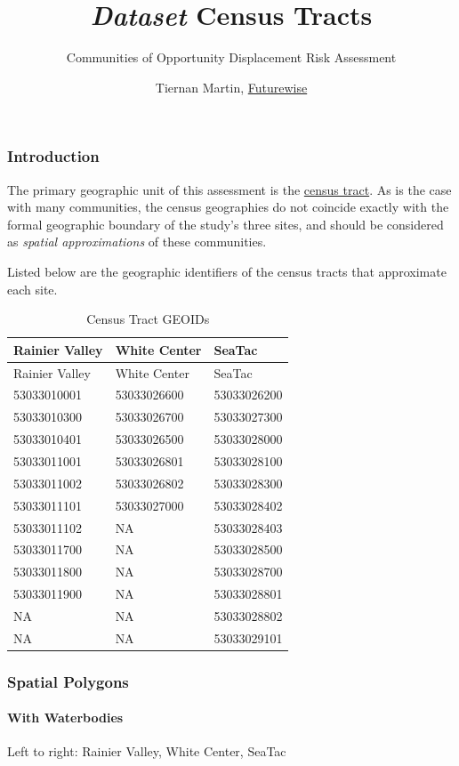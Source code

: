 \documentclass[]{article}
\title{\emph{Dataset} \textbar{} Census Tracts}
\subtitle{Communities of Opportunity Displacement Risk Assessment}
\author{Tiernan Martin, \href{http://www.futurewisewa.org/}{Futurewise}}
\date{}
\let\oldparagraph\paragraph
\renewcommand{\paragraph}[1]{\oldparagraph{#1}\mbox{}}
\begin{document}
\maketitle

\subsubsection{Introduction}\label{introduction}

The primary geographic unit of this assessment is the
\href{https://www.census.gov/geo/reference/gtc/gtc_ct.html}{census
tract}. As is the case with many communities, the census geographies do
not coincide exactly with the formal geographic boundary of the study's
three sites, and should be considered as \emph{spatial approximations}
of these communities.

Listed below are the geographic identifiers of the census tracts that
approximate each site.

\begin{longtable}[]{@{}lll@{}}
\caption{Census Tract GEOIDs}\tabularnewline
\toprule
Rainier Valley & White Center & SeaTac\tabularnewline
\midrule
\endfirsthead
\toprule
Rainier Valley & White Center & SeaTac\tabularnewline
\midrule
\endhead
53033010001 & 53033026600 & 53033026200\tabularnewline
53033010300 & 53033026700 & 53033027300\tabularnewline
53033010401 & 53033026500 & 53033028000\tabularnewline
53033011001 & 53033026801 & 53033028100\tabularnewline
53033011002 & 53033026802 & 53033028300\tabularnewline
53033011101 & 53033027000 & 53033028402\tabularnewline
53033011102 & NA & 53033028403\tabularnewline
53033011700 & NA & 53033028500\tabularnewline
53033011800 & NA & 53033028700\tabularnewline
53033011900 & NA & 53033028801\tabularnewline
NA & NA & 53033028802\tabularnewline
NA & NA & 53033029101\tabularnewline
\bottomrule
\end{longtable}

\subsubsection{Spatial Polygons}\label{spatial-polygons}

\paragraph{With Waterbodies}\label{with-waterbodies}

Left to right: Rainier Valley, White Center, SeaTac
\end{document}
